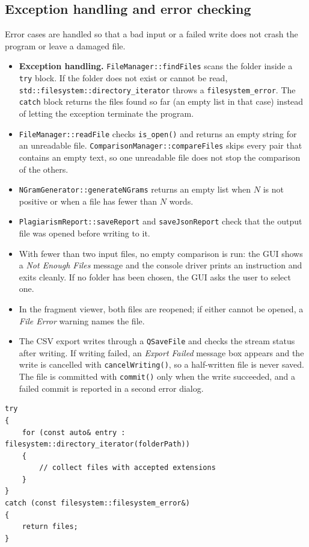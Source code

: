 \documentclass[11pt,a4paper]{report}
\newcommand{\cc}[1]{\texttt{#1}}
\begin{document}
\subsection{Exception handling and error checking}
Error cases are handled so that a bad input or a failed write does not crash the program or
leave a damaged file.
\begin{itemize}[nosep]
  \item \textbf{Exception handling.} \cc{FileManager::findFiles} scans the folder inside a
        \cc{try} block. If the folder does not exist or cannot be read,
        \cc{std::filesystem::directory\_iterator} throws a \cc{filesystem\_error}. The
        \cc{catch} block returns the files found so far (an empty list in that case)
        instead of letting the exception terminate the program.
  \item \cc{FileManager::readFile} checks \cc{is\_open()} and returns an empty string for an
        unreadable file. \cc{ComparisonManager::compareFiles} skips every pair that contains
        an empty text, so one unreadable file does not stop the comparison of the others.
  \item \cc{NGramGenerator::generateNGrams} returns an empty list when $N$ is not positive
        or when a file has fewer than $N$ words.
  \item \cc{PlagiarismReport::saveReport} and \cc{saveJsonReport} check that the output file
        was opened before writing to it.
  \item With fewer than two input files, no empty comparison is run: the GUI shows a
        \emph{Not Enough Files} message and the console driver prints an instruction and
        exits cleanly. If no folder has been chosen, the GUI asks the user to select one.
  \item In the fragment viewer, both files are reopened; if either cannot be opened, a
        \emph{File Error} warning names the file.
  \item The CSV export writes through a \cc{QSaveFile} and checks the stream status after
        writing. If writing failed, an \emph{Export Failed} message box appears and the
        write is cancelled with \cc{cancelWriting()}, so a half-written file is never
        saved. The file is committed with \cc{commit()} only when the write succeeded, and a
        failed commit is reported in a second error dialog.
\end{itemize}

\begin{lstlisting}[caption={Exception handling in \texttt{FileManager::findFiles}.}]
try
{
    for (const auto& entry : filesystem::directory_iterator(folderPath))
    {
        // collect files with accepted extensions
    }
}
catch (const filesystem::filesystem_error&)
{
    return files;
}
\end{lstlisting}
\end{document}
